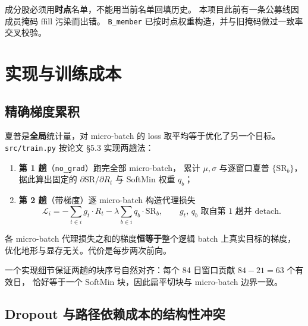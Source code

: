 \documentclass[11pt, a4paper]{ctexart}
\newcommand{\file}[1]{\texttt{\small #1}}
\begin{document}
\begin{warnbox}
成分股必须用\textbf{时点}名单，不能用当前名单回填历史。
本项目此前有一条公募线因成员掩码 ffill 污染而出错。
\file{B\_member} 已按时点权重构造，并与旧掩码做过一致率交叉校验。
\end{warnbox}

\section{实现与训练成本}

\subsection{精确梯度累积}
夏普是\textbf{全局}统计量，对 micro-batch 的 loss 取平均等于优化了另一个目标。
\file{src/train.py} 按论文 §5.3 实现两趟法：

\begin{enumerate}
  \item \textbf{第 1 趟}（\file{no\_grad}）跑完全部 micro-batch，
        累计 $\mu,\sigma$ 与逐窗口夏普 $\{\mathrm{SR}_b\}$，
        据此算出固定的 $\partial \mathrm{SR}/\partial R_t$ 与 SoftMin 权重 $q_b$；
  \item \textbf{第 2 趟}（带梯度）逐 micro-batch 构造代理损失
        \begin{equation}
          \mathcal{L}_i = -\sum_{t\in i} g_t\cdot R_t
                          - \lambda \sum_{b\in i} q_b \cdot \mathrm{SR}_b,
          \qquad g_t,\,q_b \text{ 取自第 1 趟并 detach}.
        \end{equation}
\end{enumerate}
各 micro-batch 代理损失之和的梯度\textbf{恒等于}整个逻辑 batch 上真实目标的梯度，
优化地形与显存无关。代价是每步两次前向。

\noindent
一个实现细节保证两趟的块序号自然对齐：每个 84 日窗口贡献 $84-21=63$ 个有效日，
恰好等于一个 SoftMin 块，因此扁平切块与 micro-batch 边界一致。

\subsection{Dropout 与路径依赖成本的结构性冲突}
\end{document}
